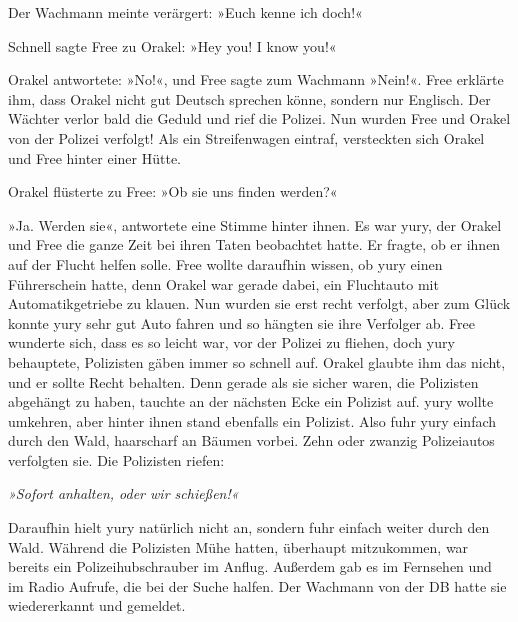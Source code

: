 Der Wachmann meinte verärgert: »Euch kenne ich doch!«

Schnell sagte Free zu Orakel: »Hey you! I know you!«

Orakel antwortete: »No!«, und Free sagte zum Wachmann »Nein!«. Free erklärte ihm, dass Orakel nicht gut Deutsch sprechen könne, sondern nur Englisch. Der Wächter verlor bald die Geduld und rief die Polizei. Nun wurden Free und Orakel von der Polizei verfolgt! Als ein Streifenwagen eintraf, versteckten sich Orakel und Free hinter einer Hütte.

Orakel flüsterte zu Free: »Ob sie uns finden werden?«

»Ja. Werden sie«, antwortete eine Stimme hinter ihnen. Es war yury, der Orakel und Free die ganze Zeit bei ihren Taten beobachtet hatte. Er fragte, ob er ihnen auf der Flucht helfen solle. Free wollte daraufhin wissen, ob yury einen Führerschein hatte, denn Orakel war gerade dabei, ein Fluchtauto mit Automatikgetriebe zu klauen. Nun wurden sie erst recht verfolgt, aber zum Glück konnte yury sehr gut Auto fahren und so hängten sie ihre Verfolger ab. Free wunderte sich, dass es so leicht war, vor der Polizei zu fliehen, doch yury behauptete, Polizisten gäben immer so schnell auf. Orakel glaubte ihm das nicht, und er sollte Recht behalten. Denn gerade als sie sicher waren, die Polizisten abgehängt zu haben, tauchte an der nächsten Ecke ein Polizist auf. yury wollte umkehren, aber hinter ihnen stand ebenfalls ein Polizist. Also fuhr yury einfach durch den Wald, haarscharf an Bäumen vorbei. Zehn oder zwanzig Polizeiautos verfolgten sie. Die Polizisten riefen:

\textit{»Sofort anhalten, oder wir schießen!«}

Daraufhin hielt yury natürlich nicht an, sondern fuhr einfach weiter durch den Wald. Während die Polizisten Mühe hatten, überhaupt mitzukommen, war bereits ein Polizeihubschrauber im Anflug. Außerdem gab es im Fernsehen und im Radio Aufrufe, die bei der Suche halfen. Der Wachmann von der DB hatte sie wiedererkannt und gemeldet.

